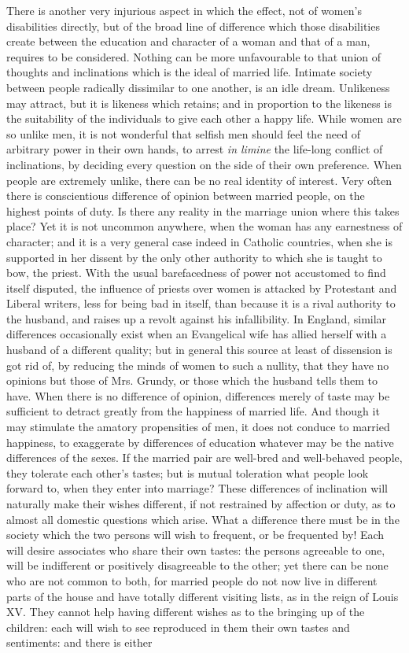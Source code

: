 \documentclass[12pt]{report}
\begin{document}
There is another very injurious aspect in which the effect, not of women's disabilities directly, but of the broad line of difference which those disabilities create between the education and character of a woman and that of a man, requires to be considered. Nothing can be more unfavourable to that union of thoughts and inclinations which is the ideal of married life. Intimate society between people radically dissimilar to one another, is an idle dream. Unlikeness may attract, but it is likeness which retains; and in proportion to the likeness is the suitability of the individuals to give each other a happy life. While women are so unlike men, it is not wonderful that selfish men should feel the need of arbitrary power in their own hands, to arrest \emph{in limine} the life-long conflict of inclinations, by deciding every question on the side of their own preference. When people are extremely unlike, there can be no real identity of interest. Very often there is conscientious difference of opinion between married people, on the highest points of duty. Is there any reality in the marriage union where this takes place? Yet it is not uncommon anywhere, when the woman has any earnestness of character; and it is a very general case indeed in Catholic countries, when she is supported in her dissent by the only other authority to which she is taught to bow, the priest. With the usual barefacedness of power not accustomed to find itself disputed, the influence of priests over women is attacked by Protestant and Liberal writers, less for being bad in itself, than because it is a rival authority to the husband, and raises up a revolt against his infallibility. In England, similar differences occasionally exist when an Evangelical wife has allied herself with a husband of a different quality; but in general this source at least of dissension is got rid of, by reducing the minds of women to such a nullity, that they have no opinions but those of Mrs. Grundy, or those which the husband tells them to have. When there is no difference of opinion, differences merely of taste may be sufficient to detract greatly from the happiness of married life. And though it may stimulate the amatory propensities of men, it does not conduce to married happiness, to exaggerate by differences of education whatever may be the native differences of the sexes. If the married pair are well-bred and well-behaved people, they tolerate each other's tastes; but is mutual toleration what people look forward to, when they enter into marriage? These differences of inclination will naturally make their wishes different, if not restrained by affection or duty, as to almost all domestic questions which arise. What a difference there must be in the society which the two persons will wish to frequent, or be frequented by! Each will desire associates who share their own tastes: the persons agreeable to one, will be indifferent or positively disagreeable to the other; yet there can be none who are not common to both, for married people do not now live in different parts of the house and have totally different visiting lists, as in the reign of Louis XV. They cannot help having different wishes as to the bringing up of the children: each will wish to see reproduced in them their own tastes and sentiments: and there is either 
\end{document}
